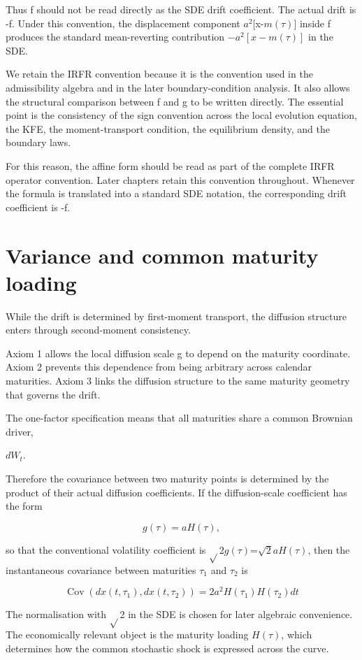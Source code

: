 \documentclass[11pt,oneside]{book}
\begin{document}
Thus f should not be read directly as the SDE drift coefficient. The
actual drift is -f. Under this convention, the displacement component
$a^2$[x-$m(\tau)$] inside f produces the standard mean-reverting
contribution $-a^2[x-m(\tau)]$ in the SDE.

We retain the IRFR convention because it is the convention used in the
admissibility algebra and in the later boundary-condition analysis. It
also allows the structural comparison between f and g to be written
directly. The essential point is the consistency of the sign convention
across the local evolution equation, the KFE, the moment-transport
condition, the equilibrium density, and the boundary laws.

For this reason, the affine form should be read as part of the complete
IRFR operator convention. Later chapters retain this convention
throughout. Whenever the formula is translated into a standard SDE
notation, the corresponding drift coefficient is -f.

\section{Variance and common maturity
loading}\label{variance-and-common-maturity-loading}

While the drift is determined by first-moment transport, the diffusion
structure enters through second-moment consistency.

Axiom 1 allows the local diffusion scale g to depend on the maturity
coordinate. Axiom 2 prevents this dependence from being arbitrary across
calendar maturities. Axiom 3 links the diffusion structure to the same
maturity geometry that governs the drift.

The one-factor specification means that all maturities share a common
Brownian driver,

$dW_t$.

Therefore the covariance between two maturity points is determined by
the product of their actual diffusion coefficients. If the
diffusion-scale coefficient has the form

\[
g(\tau)=aH(\tau),
\]

so that the conventional volatility coefficient is $\sqrt{}$2$g(\tau)$=$\sqrt{2}aH(\tau)$, then
the instantaneous covariance between maturities $\tau_1$ and $\tau_2$ is

\[
\operatorname{Cov}(dx(t,\tau_1), dx(t,\tau_2)) = 2a^2H(\tau_1)H(\tau_2)dt
\]

The normalisation with $\sqrt{}$2 in the SDE is chosen for later algebraic
convenience. The economically relevant object is the maturity loading
$H(\tau)$, which determines how the common stochastic shock is expressed
across the curve.
\end{document}

